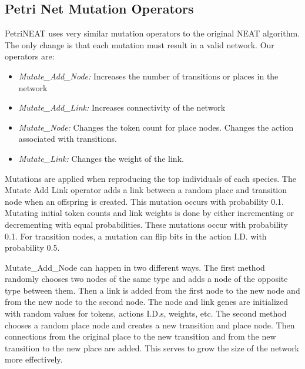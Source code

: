 \documentclass[12pt,a4paper,twocolumn]{article}
\begin{document}
\subsection{Petri Net Mutation Operators}

PetriNEAT uses very similar mutation operators to the original NEAT algorithm. The only change is that each mutation must result in a valid network. Our operators are:
\begin{itemize}
\item \emph{Mutate{\_}Add{\_}Node:} Increases the number of transitions or places in the network
\item \emph{Mutate{\_}Add{\_}Link:}  Increases connectivity of the network
\item \emph{Mutate{\_}Node:}  Changes the token count for place nodes. Changes the action associated with transitions.
\item \emph{Mutate{\_}Link:} Changes the weight of the link.
\end{itemize}

Mutations are applied when reproducing the top individuals of each species. The Mutate Add Link operator adds a link between a random place and transition node when an offspring is created. This mutation occurs with probability 0.1. Mutating initial token counts and link weights is done by either incrementing or decrementing with equal probabilities. These mutations occur with probability 0.1. For transition nodes, a mutation can flip bits in the action I.D. with probability 0.5. 

Mutate{\_}Add{\_}Node can happen in two different ways. The first method randomly chooses two nodes of the same type and adds a node of the opposite type between them. Then a link is added from the first node to the new node and from the new node to the second node. The node and link genes are initialized with random values for tokens, actions I.D.s, weights, etc. The second method chooses a random place node and creates a new transition and place node. Then connections from the original place to the new transition and from the new transition to the new place are added. This serves to grow the size of the network more effectively.
\end{document}
